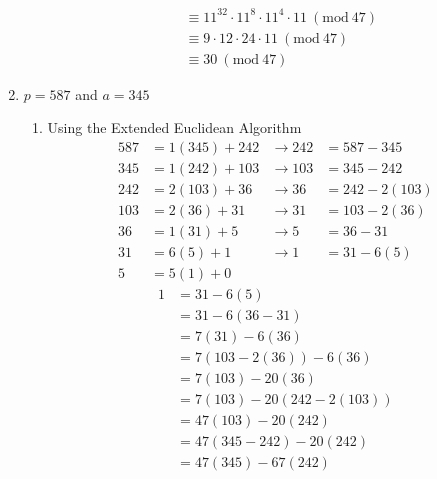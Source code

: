 \documentclass{article}
\newcommand{\Mod}[1]{\ (\mathrm{mod}\ #1)}
\begin{document}
\begin{enumerate}[label=\alph*)]
\begin{enumerate}[label=(\roman*)]
\begin{align*}
                                  & \equiv 11^{32} \cdot 11^{8} \cdot 11^{4} \cdot 11 \Mod{47} \\
                                  & \equiv 9 \cdot 12 \cdot 24 \cdot 11 \Mod{47}               \\
                                  & \equiv 30 \Mod{47}
                    \end{align*}
          \end{enumerate}
    \item $p = 587$ and $a=345$
          \begin{enumerate}[label=(\roman*)]
              \item Using the Extended Euclidean Algorithm
                    \begin{align*}
                        587 & = 1(345) + 242 & \rightarrow 242 & =587-345    \\
                        345 & = 1(242) + 103 & \rightarrow 103 & =345-242    \\
                        242 & = 2(103) + 36  & \rightarrow 36  & =242-2(103) \\
                        103 & = 2(36) + 31   & \rightarrow 31  & =103-2(36)  \\
                        36  & = 1(31) + 5    & \rightarrow 5   & =36-31      \\
                        31  & = 6(5) + 1     & \rightarrow 1   & =31-6(5)    \\
                        5   & = 5(1) + 0
                    \end{align*}
                    \begin{align*}
                        1 & = 31-6(5)                     \\
                          & = 31-6(36-31)                 \\
                          & = 7(31) - 6(36)               \\
                          & = 7(103-2(36)) - 6(36)        \\
                          & = 7(103) - 20(36)             \\
                          & = 7(103) - 20(242-2(103))     \\
                          & = 47(103) - 20(242)           \\
                          & = 47(345-242) - 20(242)       \\
                          & = 47(345) - 67(242)           \\

\end{align*}
\end{enumerate}
\end{enumerate}
\end{document}
